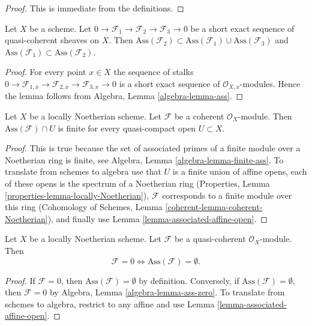 \begin{proof}
This is immediate from the definitions.
\end{proof}

\begin{lemma}
\label{lemma-ses-ass}
Let $X$ be a scheme.
Let $0 \to \mathcal{F}_1 \to \mathcal{F}_2 \to \mathcal{F}_3 \to 0$
be a short exact sequence of quasi-coherent sheaves on $X$.
Then
$\text{Ass}(\mathcal{F}_2) \subset
\text{Ass}(\mathcal{F}_1) \cup \text{Ass}(\mathcal{F}_3)$
and
$\text{Ass}(\mathcal{F}_1) \subset \text{Ass}(\mathcal{F}_2)$.
\end{lemma}

\begin{proof}
For every point $x \in X$ the sequence of stalks
$0 \to \mathcal{F}_{1, x} \to \mathcal{F}_{2, x} \to \mathcal{F}_{3, x} \to 0$
is a short exact sequence of $\mathcal{O}_{X, x}$-modules.
Hence the lemma follows from
Algebra, Lemma \ref{algebra-lemma-ass}.
\end{proof}

\begin{lemma}
\label{lemma-finite-ass}
Let $X$ be a locally Noetherian scheme.
Let $\mathcal{F}$ be a coherent $\mathcal{O}_X$-module.
Then $\text{Ass}(\mathcal{F}) \cap U$ is finite for
every quasi-compact open $U \subset X$.
\end{lemma}

\begin{proof}
This is true because the set of associated primes of a finite module over
a Noetherian ring is finite, see
Algebra, Lemma \ref{algebra-lemma-finite-ass}.
To translate from schemes to algebra use that $U$ is a finite union of
affine opens, each of these opens is the spectrum of a Noetherian ring
(Properties, Lemma \ref{properties-lemma-locally-Noetherian}),
$\mathcal{F}$ corresponds to a finite module over this ring
(Cohomology of Schemes, Lemma \ref{coherent-lemma-coherent-Noetherian}),
and finally use
Lemma \ref{lemma-associated-affine-open}.
\end{proof}

\begin{lemma}
\label{lemma-ass-zero}
Let $X$ be a locally Noetherian scheme. Let $\mathcal{F}$ be a
quasi-coherent $\mathcal{O}_X$-module. Then
$$
\mathcal{F} = 0 \Leftrightarrow \text{Ass}(\mathcal{F}) = \emptyset.
$$
\end{lemma}

\begin{proof}
If $\mathcal{F} = 0$, then $\text{Ass}(\mathcal{F}) = \emptyset$
by definition. Conversely, if $\text{Ass}(\mathcal{F}) = \emptyset$,
then $\mathcal{F} = 0$ by
Algebra, Lemma \ref{algebra-lemma-ass-zero}.
To translate from schemes to algebra, restrict to any affine and use
Lemma \ref{lemma-associated-affine-open}.
\end{proof}

